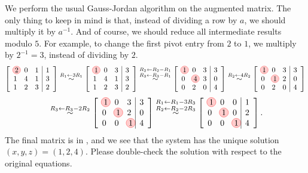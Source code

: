 \begin{solution}
  We perform the usual Gauss-Jordan algorithm on the augmented
  matrix. The only thing to keep in mind is that, instead of dividing
  a row by $a$, we should multiply it by $a^{-1}$. And of course, we
  should reduce all intermediate results modulo $5$. For example, to
  change the first pivot entry from $2$ to $1$, we multiply by
  $2^{-1}=3$, instead of dividing by $2$.
  \begin{equation*}
    \leftB
    \begin{array}{rrr|r}
      \circled{2} & 0 & 1 & 1 \\
      1 & 4 & 1 & 3 \\
      1 & 2 & 3 & 2
    \end{array}
    \rightB
    \stackrel{R_1\leftarrow 3R_1}{\sim}
    \leftB
    \begin{array}{rrr|r}
      \circled{1} & 0 & 3 & 3 \\
      1 & 4 & 1 & 3 \\
      1 & 2 & 3 & 2
    \end{array}
    \rightB
    \stackrel{R_2\leftarrow R_2-R_1}{\stackrel{R_3\leftarrow R_3-R_1}{\sim}}
    \leftB
    \begin{array}{rrr|r}
      \circled{1} & 0 & 3 & 3 \\
      0 & \circled{4} & 3 & 0 \\
      0 & 2 & 0 & 4
    \end{array}
    \rightB
    \stackrel{R_2\leftarrow 4R_2}{\sim}
    \leftB
    \begin{array}{rrr|r}
      \circled{1} & 0 & 3 & 3 \\
      0 & \circled{1} & 2 & 0 \\
      0 & 2 & 0 & 4
    \end{array}
    \rightB
  \end{equation*}
  \begin{equation*}
    {}
    \stackrel{R_3\leftarrow R_3-2R_2}{\sim}
    \leftB
    \begin{array}{rrr|r}
      \circled{1} & 0 & 3 & 3 \\
      0 & \circled{1} & 2 & 0 \\
      0 & 0 & \circled{1} & 4
    \end{array}
    \rightB
    \stackrel{R_1\leftarrow R_1-3R_3}{\stackrel{R_2\leftarrow R_2-2R_3}{\sim}}
    \leftB
    \begin{array}{rrr|r}
      \circled{1} & 0 & 0 & 1 \\
      0 & \circled{1} & 0 & 2 \\
      0 & 0 & \circled{1} & 4
    \end{array}
    \rightB.
  \end{equation*}
  The final matrix is in {\rref}, and we see that the system has the
  unique solution $(x,y,z) = (1,2,4)$. Please double-check the
  solution with respect to the original equations.
\end{solution}

